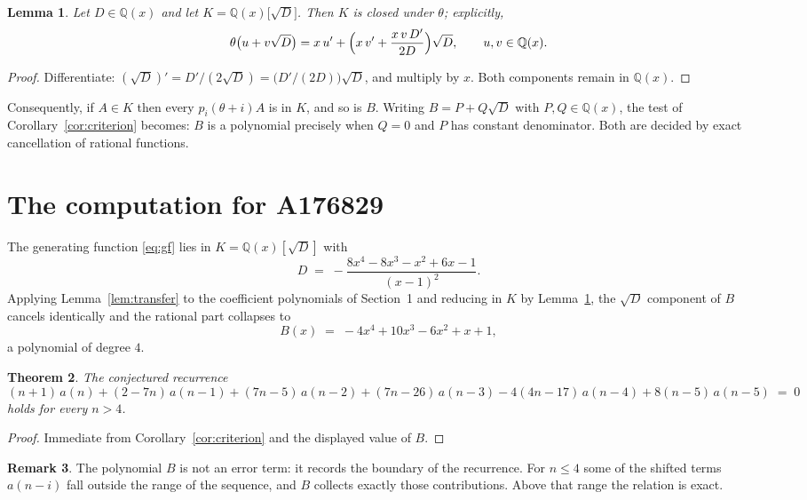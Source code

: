\documentclass[11pt,a4paper]{article}
\theoremstyle{plain}
\newtheorem{theorem}{Theorem}
\newtheorem{lemma}[theorem]{Lemma}
\theoremstyle{definition}
\newtheorem{remark}[theorem]{Remark}
\begin{document}
\begin{lemma}\label{lem:field}
Let $D\in\mathbb{Q}(x)$ and let $K=\mathbb{Q}(x)\bigl[\sqrt{D}\bigr]$. Then $K$ is closed
under $\theta$; explicitly,
\[
\theta\bigl(u+v\sqrt{D}\bigr)=x\,u'+\Bigl(x\,v'+\frac{x\,v\,D'}{2D}\Bigr)\sqrt{D},
\qquad u,v\in\mathbb{Q}(x).
\]
\end{lemma}

\begin{proof}
Differentiate: $(\sqrt{D})'=D'/(2\sqrt{D})=\bigl(D'/(2D)\bigr)\sqrt{D}$, and multiply by
$x$. Both components remain in $\mathbb{Q}(x)$.
\end{proof}

Consequently, if $A\in K$ then every $p_{i}(\theta+i)A$ is in $K$, and so is $B$. Writing
$B=P+Q\sqrt{D}$ with $P,Q\in\mathbb{Q}(x)$, the test of Corollary~\ref{cor:criterion}
becomes: $B$ is a polynomial precisely when $Q=0$ and $P$ has constant denominator. Both
are decided by exact cancellation of rational functions.

\section{The computation for A176829}

The generating function \eqref{eq:gf} lies in $K=\mathbb{Q}(x)[\sqrt{D}]$ with
\[
D \;=\; - \frac{8 x^{4} - 8 x^{3} - x^{2} + 6 x - 1}{\left(x - 1\right)^{2}} .
\]
Applying Lemma~\ref{lem:transfer} to the coefficient polynomials of Section~1 and reducing
in $K$ by Lemma~\ref{lem:field}, the $\sqrt{D}$ component of $B$ cancels identically and
the rational part collapses to
\[
B(x)\;=\;- 4 x^{4} + 10 x^{3} - 6 x^{2} + x + 1 ,
\]
a polynomial of degree $4$.

\begin{theorem}
The conjectured recurrence
\[
(n + 1)\,a(n) + (2 - 7 n)\,a(n-1) + (7 n - 5)\,a(n-2) + (7 n - 26)\,a(n-3) -  4 \left(4 n - 17\right)\,a(n-4) + 8 \left(n - 5\right)\,a(n-5) \;=\;0
\]
holds for every $n>4$.
\end{theorem}

\begin{proof}
Immediate from Corollary~\ref{cor:criterion} and the displayed value of $B$.
\end{proof}

\begin{remark}
The polynomial $B$ is not an error term: it records the boundary of the recurrence. For
$n\le4$ some of the shifted terms $a(n-i)$ fall outside the range of the sequence,
and $B$ collects exactly those contributions. Above that range the relation is exact.
\end{remark}
\end{document}
